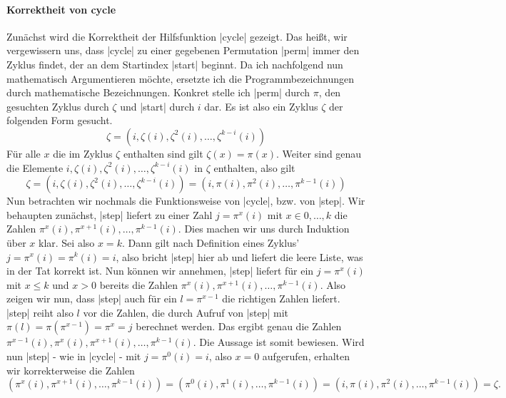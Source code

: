 \paragraph{Korrektheit von cycle}
Zunächst wird die Korrektheit der Hilfsfunktion |cycle| gezeigt.
Das heißt, wir vergewissern uns, dass |cycle| zu einer gegebenen Permutation |perm| immer den Zyklus findet, der an dem Startindex |start| beginnt.
Da ich nachfolgend nun mathematisch Argumentieren möchte, ersetzte ich die Programmbezeichnungen durch mathematische Bezeichnungen.
Konkret stelle ich |perm| durch $\pi$, den gesuchten Zyklus durch $\zeta$ und |start| durch $i$ dar.
Es ist also ein Zyklus $\zeta$ der folgenden Form gesucht.
\[ \zeta = (i, \zeta(i),\zeta^2(i), \dots, \zeta^{k-i}(i)) \]
Für alle $x$ die im Zyklus $\zeta$ enthalten sind gilt $\zeta(x) = \pi(x)$.
Weiter sind genau die Elemente \linebreak $i, \zeta(i),\zeta^2(i), \dots, \zeta^{k-i}(i)$ in $\zeta$ enthalten, also gilt
\[ \zeta = (i, \zeta(i),\zeta^2(i), \dots, \zeta^{k-i}(i)) = (i, \pi(i),\pi^2(i), \dots, \pi^{k-1}(i)) \]
Nun betrachten wir nochmals die Funktionsweise von |cycle|, bzw. von |step|.
Wir behaupten zunächst, |step| liefert zu einer Zahl $j = \pi^x(i)$ mit $x \in {0,\dots,k}$ die Zahlen $\pi^x(i), \pi^{x+1}(i), \dots, \pi^{k-1}(i)$.
Dies machen wir uns durch Induktion über $x$ klar. Sei also $x = k$.
Dann gilt nach Definition eines Zyklus' $j = \pi^x(i) = \pi^k(i) = i$, also bricht |step| hier ab und liefert die leere Liste, was in der Tat korrekt ist.
Nun können wir annehmen, |step| liefert für ein $j = \pi^x(i)$ mit $x \leq k$ und $x > 0$ bereits die Zahlen $\pi^x(i), \pi^{x+1}(i), \dots, \pi^{k-1}(i)$.
Also zeigen wir nun, dass |step| auch für ein $l = \pi^{x-1}$ die richtigen Zahlen liefert.
|step| reiht also $l$ vor die Zahlen, die durch Aufruf von |step| mit $\pi(l) = \pi(\pi^{x-1}) = \pi^x = j$ berechnet werden.
Das ergibt genau die Zahlen $\pi^{x-1}(i), \pi^x(i), \pi^{x+1}(i), \dots, \pi^{k-1}(i)$.
Die Aussage ist somit bewiesen.
Wird nun |step| - wie in |cycle| - mit $j = \pi^0(i) = i$, also $x = 0$ aufgerufen, erhalten wir korrekterweise die Zahlen
\[ (\pi^x(i), \pi^{x+1}(i), \dots, \pi^{k-1}(i)) = (\pi^0(i), \pi^1(i), \dots, \pi^{k-1}(i)) = (i, \pi(i), \pi^2(i), \dots, \pi^{k-1}(i)) = \zeta.\]
